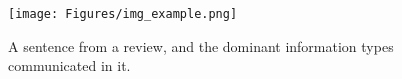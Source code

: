 \begin{figure}[t]
  \centering
  \texttt{[image: Figures/img\_example.png]}
  \caption{A sentence from a review, and the dominant information types communicated in it.}
  \label{fig_example}
\end{figure}